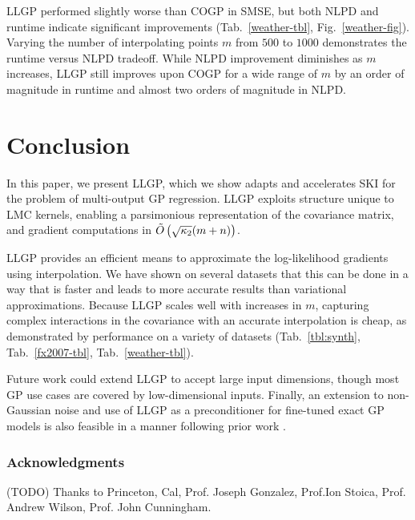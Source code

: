 \documentclass[twoside]{article}
\newif\ifanonymized
\begin{document}
LLGP performed slightly worse than COGP in SMSE, but both NLPD and runtime indicate significant improvements (Tab.~\ref{weather-tbl}, Fig.~\ref{weather-fig}). Varying the number of interpolating points $m$ from $500$ to $1000$ demonstrates the runtime versus NLPD tradeoff. While NLPD improvement diminishes as $m$ increases, LLGP still improves upon COGP for a wide range of $m$ by an order of magnitude in runtime and almost two orders of magnitude in NLPD.


\section{Conclusion}\label{conclusion}

In this paper, we present LLGP, which we show adapts and accelerates SKI \citep{kiss-gp} for the problem of multi-output GP regression. LLGP exploits structure unique to LMC kernels,  enabling a parsimonious representation of the covariance matrix, and gradient computations in $\tilde{O}\left({\sqrt{\kappa_2}(m+n)}\right)$.

LLGP provides an efficient means to approximate the log-likelihood gradients using interpolation. We have shown on several datasets that this can be done in a way that is faster and leads to more accurate results than variational approximations. Because LLGP scales well with increases in $m$, capturing complex interactions in the covariance with an accurate interpolation is cheap, as demonstrated by performance on a variety of datasets (Tab.~\ref{tbl:synth}, Tab.~\ref{fx2007-tbl}, Tab.~\ref{weather-tbl}).

Future work could extend LLGP to accept large input dimensions, though most GP use cases are covered by low-dimensional inputs. Finally, an extension to non-Gaussian noise and use of LLGP as a preconditioner for fine-tuned exact GP models is also feasible in a manner following prior work \citep{cutajar2016preconditioning}.

\pagebreak
\ifanonymized

\else
\subsubsection*{Acknowledgments}
(TODO) Thanks to Princeton, Cal, Prof. Joseph Gonzalez, Prof.Ion Stoica, Prof. Andrew Wilson, Prof. John Cunningham.
\fi



\end{document}

